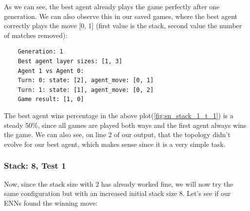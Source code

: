 \documentclass[11pt]{report}
\begin{document}
\begin{enumerate}
\begin{center}
    \end{center}

    As we can see, the best agent already plays the game perfectly after one generation.
    We can also observe this in our saved games, where the best agent correctly plays the move [0, 1] (first value is the stack, second value the number of matches removed):
    \begin{verbatim}
    Generation: 1
    Best agent layer sizes: [1, 3]
    Agent 1 vs Agent 0:
    Turn: 0: state: [2], agent_move: [0, 1]
    Turn: 1: state: [1], agent_move: [0, 2]
    Game result: [1, 0]
    \end{verbatim}
    The best agent wins percentage in the above plot(\ref{fig:sn_stack_1_t_1}) is a steady 50\%, since all games are played both ways and the first agent always wins the game.
    We can also see, on line 2 of our output, that the topology didn't evolve for our best agent, which makes sense since it is a very simple task.
            \subsubsection{Stack: 8, Test 1}
    Now, since the stack size with 2 has already worked fine, we will now try the same configuration but with an increased initial stack size 8.
    Let's see if our ENNs found the winning move:
    \\
    \renewcommand{\csvpath}{../data/simple_nim/stack_8/t_1/stats.csv} %
    \begin{center}
\end{center}
\end{enumerate}
\end{document}
